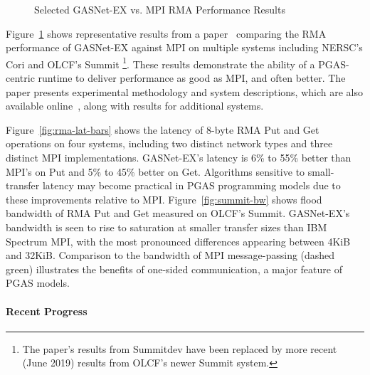 \begin{figure}[htb]
  \centering
  \caption{\label{fig:gasnet-ex-rma} Selected GASNet-EX vs. MPI RMA Performance Results}
\end{figure}

Figure~\ref{fig:gasnet-ex-rma} shows representative results from a
paper~\cite{gasnet-lcpc18} comparing
the RMA performance of GASNet-EX against MPI on multiple systems including
NERSC's Cori and OLCF's Summit%
\footnote{The paper's results from Summitdev
have been replaced by more recent (June 2019) results from OLCF's newer Summit system.}.
These results demonstrate the ability of a PGAS-centric runtime to
deliver performance as good as MPI, and often better.
%
The paper presents experimental methodology and system descriptions, which are
also available online~\cite{gasnet-site}, along with results for additional
systems.

Figure~\ref{fig:rma-lat-bars} shows the latency of 8-byte RMA Put and Get operations on
four systems, including two distinct network types and three distinct MPI
implementations.
%
GASNet-EX's latency is 6\% to 55\% better than MPI's on Put and 5\% to 45\%
better on Get.
%
Algorithms sensitive to small-transfer latency may become practical in PGAS
programming models due to these improvements relative to MPI.
%
Figure~\ref{fig:summit-bw} shows flood bandwidth of RMA Put and Get measured
on OLCF's Summit.
GASNet-EX's bandwidth is seen to rise to saturation at smaller
transfer sizes than IBM Spectrum MPI, with the most pronounced differences
appearing between 4KiB and 32KiB.
%
Comparison to the bandwidth of MPI message-passing (dashed green) illustrates the
benefits of one-sided communication, a major feature of PGAS models.


\paragraph{Recent Progress}

